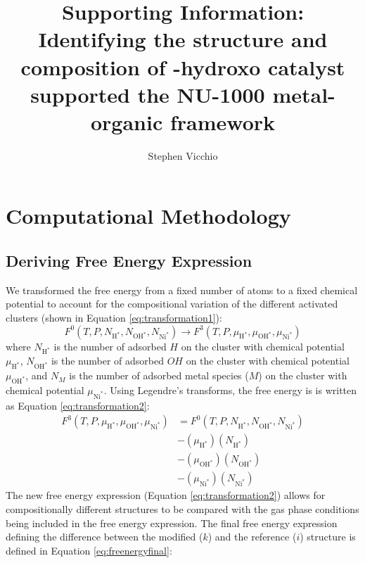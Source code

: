 \documentclass[12pt]{article}
\title{Supporting Information: \\
Identifying the structure and composition of \ce{Ni(II)}-hydroxo catalyst supported the NU-1000 metal-organic framework
}
\author{Stephen Vicchio}
\begin{document}
\maketitle

\newpage
\tableofcontents

\newpage
\section{Computational Methodology}
\subsection{Deriving Free Energy Expression}
We transformed the free energy from a fixed number of atoms to a fixed chemical potential to account for the compositional variation of the different activated clusters (shown in Equation \ref{eq:transformation1}):
\begin{equation}
    F^{0}(T,P,N_{\text{H}^{*}},N_{\text{OH}^{*}},N_{\text{Ni}^{*}}) \rightarrow F^{3}(T,P,\mu_{\text{H}^{*}},\mu_{\text{OH}^{*}},\mu_{\text{Ni}^{*}})
    \label{eq:transformation1}
\end{equation}
where $N_{\text{H}^{*}}$ is the number of adsorbed $H$ on the cluster with chemical potential $\mu_{\text{H}^{*}}$, $N_{\text{OH}^{*}}$ is the number of adsorbed $OH$ on the cluster with chemical potential $\mu_{\text{OH}^{*}}$, and $N_{M}$ is the number of adsorbed metal species ($M$) on the cluster with chemical potential $\mu_{\text{Ni}^{*}}$. Using Legendre's transforms, the free energy is is written as Equation \ref{eq:transformation2}:
\begin{equation}
    \begin{split}
        F^{3}(T,P,\mu_{\text{H}^{*}},\mu_{\text{OH}^{*}},\mu_{\text{Ni}^{*}}) &= F^{0}(T,P,N_{\text{H}^{*}},N_{\text{OH}^{*}},N_{\text{Ni}^{*}}) \\ &- (\mu_{\text{H}^{*}})(N_{\text{H}^{*}}) \\ &- (\mu_{\text{OH}^{*}})(N_{\text{OH}^{*}}) \\ &- (\mu_{\text{Ni}^{*}})(N_{\text{Ni}^{*}})  
        \label{eq:transformation2}    
    \end{split}
\end{equation}
The new free energy expression (Equation \ref{eq:transformation2}) allows for compositionally different structures to be compared with the gas phase conditions being included in the free energy expression. The final free energy expression defining the difference between the modified ($k$) and the reference ($i$) structure is defined in Equation \ref{eq:freenergyfinal}:
\end{document}
